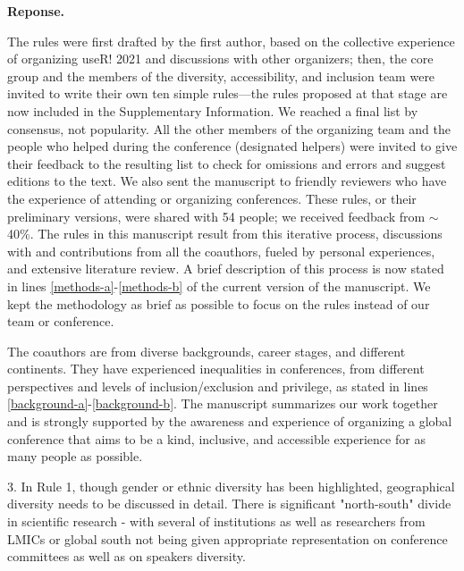 \documentclass{article}
\newenvironment{Reply}{\noindent\color{BlueViolet}\textbf{Reponse.}}{\vspace{1em}}
\begin{document}
\begin{Reply}

    The rules were first drafted by the first author, based on the collective experience of organizing useR! 2021 and discussions with other organizers; then, the core group and the members of the diversity, accessibility, and inclusion team were invited to write their own ten simple rules—the rules proposed at that stage are now included in the Supplementary Information.
    We reached a final list by consensus, not popularity. All the other members of the organizing team and the people who helped during the conference (designated helpers) were invited to give their feedback to the resulting list to check for omissions and errors and suggest editions to the text.
    We also sent the manuscript to friendly reviewers who have the experience of attending or organizing conferences. 
    These rules, or their preliminary versions, were shared with 54 people; we received feedback from $\sim$40\%.
    The rules in this manuscript result from this iterative process, discussions with and contributions from all the coauthors, fueled by personal experiences, and extensive literature review.
    A brief description of this process is now stated in lines \ref{methods-a}-\ref{methods-b} of the current version of the manuscript.
    We kept the methodology as brief as possible to focus on the rules instead of our team or conference. 
    
    The coauthors are from diverse backgrounds, career stages, and different continents. They have experienced inequalities in conferences, from different perspectives and levels of inclusion/exclusion and privilege, as stated in lines \ref{background-a}-\ref{background-b}.
    The manuscript summarizes our work together and is strongly supported by the awareness and experience of organizing a global conference that aims to be a kind, inclusive, and accessible experience for as many people as possible.
\end{Reply}

3. In Rule 1, though gender or ethnic diversity has been highlighted, geographical diversity needs to be discussed in detail. There is significant "north-south" divide in scientific research - with several of institutions as well as researchers from LMICs or global south not being given appropriate representation on conference committees as well as on speakers diversity.
\end{document}
